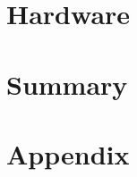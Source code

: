 \documentclass[final,12pt,twoside]{mcthesis}
\begin{document}
\newpage


\newpage


\newpage
\chapter{Hardware}



\newpage


\newpage
\chapter{Summary}




\appendix
\chapter{Appendix}

\label{body end}
\end{document}
